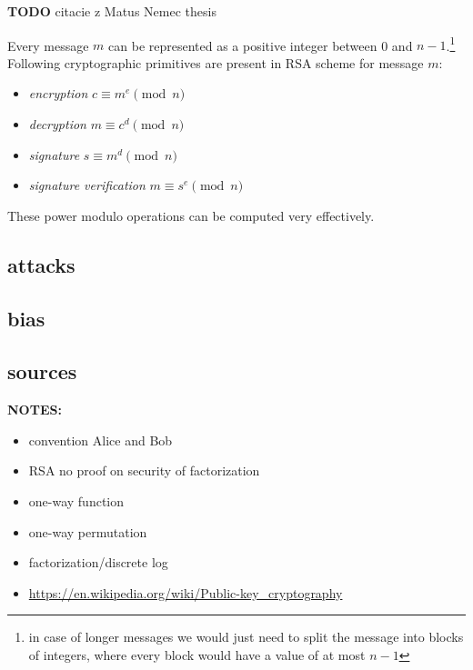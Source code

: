 \textbf{TODO } citacie z Matus Nemec thesis

Every message $m$ can be represented as a positive integer between 0 and $n-1$.\footnote{in case of longer messages we would just need to split the message into blocks of integers, where every block would have a value of at most $n-1$} Following cryptographic primitives are present in RSA scheme for message $m$:

\begin{itemize}

\item \textit{encryption} $c \equiv m^e \pmod{n}$
\item \textit{decryption} $m \equiv c^d \pmod{n}$
\item \textit{signature} $s \equiv m^d \pmod{n}$
\item \textit{signature verification} $m \equiv s^e \pmod{n}$

\end{itemize}

These power modulo operations can be computed very effectively.

\subsection*{attacks}
\subsection*{bias}
\subsection*{sources}


\textbf{NOTES:}
\begin{itemize}
\item convention Alice and Bob
\item RSA no proof on security of factorization
\item one-way function
\item one-way permutation
\item factorization/discrete log
\item \url{https://en.wikipedia.org/wiki/Public-key_cryptography}
\end{itemize}
